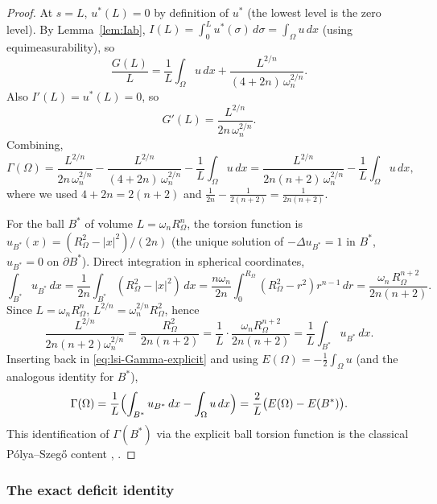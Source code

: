 \begin{proof}
At $s=L$, $u^{*}(L)=0$ by definition of $u^{*}$ (the lowest level is the
zero level). By Lemma~\ref{lem:Iab},
$I(L)=\int_{0}^{L}u^{*}(\sigma)\,d\sigma=\int_{\Omega}u\,dx$ (using
equimeasurability), so
\[
   \frac{G(L)}{L}=\frac{1}{L}\int_{\Omega}u\,dx
                  +\frac{L^{2/n}}{(4+2n)\,\omega_{n}^{2/n}}.
\]
Also $I'(L)=u^{*}(L)=0$, so
\[
   G'(L)=\frac{L^{2/n}}{2n\,\omega_{n}^{2/n}}.
\]
Combining,
\begin{equation}\label{eq:lsi-Gamma-explicit}
   \Gamma(\Omega)
   =\frac{L^{2/n}}{2n\,\omega_{n}^{2/n}}
    -\frac{L^{2/n}}{(4+2n)\,\omega_{n}^{2/n}}
    -\frac{1}{L}\int_{\Omega}u\,dx
   =\frac{L^{2/n}}{2n(n+2)\,\omega_{n}^{2/n}}
    -\frac{1}{L}\int_{\Omega}u\,dx,
\end{equation}
where we used $4+2n=2(n+2)$ and
$\frac{1}{2n}-\frac{1}{2(n+2)}=\frac{1}{2n(n+2)}$.

For the ball $B^{*}$ of volume $L=\omega_{n}R_{\Omega}^{n}$, the torsion
function is $u_{B^{*}}(x)=(R_{\Omega}^{2}-|x|^{2})/(2n)$ (the unique
solution of $-\Delta u_{B^{*}}=1$ in $B^{*}$, $u_{B^{*}}=0$ on
$\partial B^{*}$). Direct integration in spherical coordinates,
\[
   \int_{B^{*}}u_{B^{*}}\,dx
   =\frac{1}{2n}\int_{B^{*}}(R_{\Omega}^{2}-|x|^{2})\,dx
   =\frac{n\omega_{n}}{2n}\int_{0}^{R_{\Omega}}(R_{\Omega}^{2}-r^{2})r^{n-1}\,dr
   =\frac{\omega_{n}\,R_{\Omega}^{n+2}}{2n(n+2)}.
\]
Since $L=\omega_{n}R_{\Omega}^{n}$, $L^{2/n}=\omega_{n}^{2/n}R_{\Omega}^{2}$,
hence
\[
   \frac{L^{2/n}}{2n(n+2)\omega_{n}^{2/n}}
   =\frac{R_{\Omega}^{2}}{2n(n+2)}
   =\frac{1}{L}\cdot\frac{\omega_{n}R_{\Omega}^{n+2}}{2n(n+2)}
   =\frac{1}{L}\int_{B^{*}}u_{B^{*}}\,dx.
\]
Inserting back in \eqref{eq:lsi-Gamma-explicit} and using
$E(\Omega)=-\tfrac12\int_{\Omega}u$ (and the analogous identity for $B^{*}$),
\[
   \Gamma(\Omega)
   =\frac{1}{L}\Bigl(\int_{B^{*}}u_{B^{*}}\,dx-\int_{\Omega}u\,dx\Bigr)
   =\frac{2}{L}\bigl(E(\Omega)-E(B^{*})\bigr).
\]
This identification of $\Gamma(B^{*})$ via the explicit ball torsion
function is the classical P\'olya--Szeg\H{o} content
\cite{PolyaSzego1951}, \cite[\S II.5]{Bandle1980}.
\end{proof}

\subsubsection{The exact deficit identity}
\label{sssec:lsi-main}

